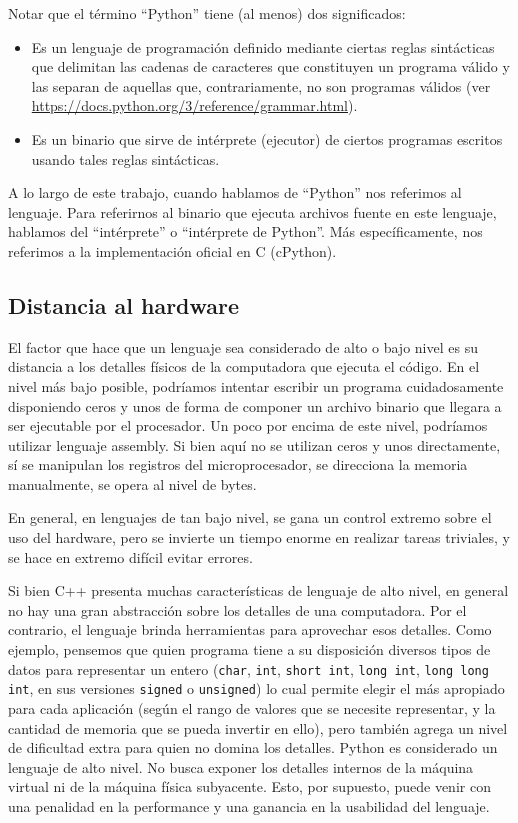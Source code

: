 Notar que el término ``Python'' tiene (al menos) dos significados:

\begin{itemize}
    \item Es un lenguaje de programación definido mediante ciertas reglas
    sintácticas que delimitan las cadenas de caracteres que constituyen un
    programa válido y las separan de aquellas que, contrariamente, no son
    programas válidos (ver \url{https://docs.python.org/3/reference/grammar.html}).

    \item Es un binario que sirve de intérprete (ejecutor) de ciertos programas
    escritos usando tales reglas sintácticas.
\end{itemize}

A lo largo de este trabajo, cuando hablamos de ``Python'' nos referimos al
lenguaje. Para referirnos al binario que ejecuta archivos fuente en este
lenguaje, hablamos del ``intérprete'' o ``intérprete de Python''. Más
específicamente, nos referimos a la implementación oficial en C (cPython). 

\subsection{Distancia al hardware}

El factor que hace que un lenguaje sea considerado de alto o bajo nivel es su
distancia a los detalles físicos de la computadora que ejecuta el código.
En el nivel más bajo posible, podríamos intentar escribir un programa
cuidadosamente disponiendo ceros y unos de forma de componer un archivo binario
que llegara a ser ejecutable por el procesador. Un poco por encima de este
nivel, podríamos utilizar lenguaje assembly. Si bien aquí no se utilizan ceros
y unos directamente, sí se manipulan los registros del microprocesador, se
direcciona la memoria manualmente, se opera al nivel de bytes.

En general, en lenguajes de tan bajo nivel, se gana un control extremo sobre el
uso del hardware, pero se invierte un tiempo enorme en realizar tareas
triviales, y se hace en extremo difícil evitar errores.

Si bien C++ presenta muchas características de lenguaje de alto nivel, en
general no hay una gran abstracción sobre los detalles de una computadora. Por
el contrario, el lenguaje brinda herramientas para aprovechar esos detalles.
Como ejemplo, pensemos que quien programa tiene a su disposición diversos tipos
de datos para representar un entero (\verb!char!, \verb!int!, \verb!short int!,
\verb!long int!, \verb!long long int!, en sus versiones \verb!signed! o
\verb!unsigned!) lo cual permite elegir el más apropiado para cada aplicación
(según el rango de valores que se necesite representar, y la cantidad de
memoria que se pueda invertir en ello), pero también agrega un nivel de
dificultad extra para quien no domina los detalles. Python es considerado un
lenguaje de alto nivel. No busca exponer los detalles internos de la máquina
virtual ni de la máquina física subyacente. Esto, por supuesto, puede venir con
una penalidad en la performance y una ganancia en la usabilidad del lenguaje.

